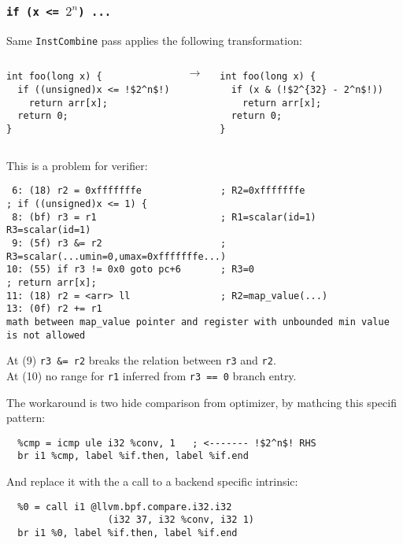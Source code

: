 \documentclass{beamer}
\newcommand{\code}[1]{\texttt{#1}}
\begin{document}
\begin{frame}
  \frametitle{\code{if (x <= $2^n$) \hspace{1em}...}}

Same \code{InstCombine} pass applies the following transformation:

  \vspace{0.5cm}

  \begin{columns}
    \begin{minipage}{\textwidth}
      \begin{verbatim}
int foo(long x) {
  if ((unsigned)x <= !$2^n$!)
    return arr[x];
  return 0;
}
      \end{verbatim}
    \end{minipage}
    $\rightarrow$
    \begin{minipage}{\textwidth}
      \begin{verbatim}
int foo(long x) {
  if (x & (!$2^{32} - 2^n$!))
    return arr[x];
  return 0;
}
      \end{verbatim}
    \end{minipage}
  \end{columns}

  \framebreak
  
  This is a problem for verifier:

  \begin{verbatim}
 6: (18) r2 = 0xfffffffe              ; R2=0xfffffffe
; if ((unsigned)x <= 1) {
 8: (bf) r3 = r1                      ; R1=scalar(id=1) R3=scalar(id=1)
 9: (5f) r3 &= r2                     ; R3=scalar(...umin=0,umax=0xfffffffe...)
10: (55) if r3 != 0x0 goto pc+6       ; R3=0
; return arr[x];
11: (18) r2 = <arr> ll                ; R2=map_value(...)
13: (0f) r2 += r1
math between map_value pointer and register with unbounded min value is not allowed
  \end{verbatim}

At (9) \code{r3 \&= r2} breaks the relation between \code{r3} and \code{r2}.\\
At (10) no range for \code{r1} inferred from \code{r3 == 0} branch entry.

  \framebreak

  The workaround is two hide comparison from optimizer, by mathcing
  this specifi pattern:

\begin{verbatim}
  %cmp = icmp ule i32 %conv, 1   ; <------- !$2^n$! RHS
  br i1 %cmp, label %if.then, label %if.end
\end{verbatim}

And replace it with the a call to a backend specific intrinsic:

\begin{verbatim}
  %0 = call i1 @llvm.bpf.compare.i32.i32
                  (i32 37, i32 %conv, i32 1)
  br i1 %0, label %if.then, label %if.end
\end{verbatim}
  
\end{frame}
\end{document}
